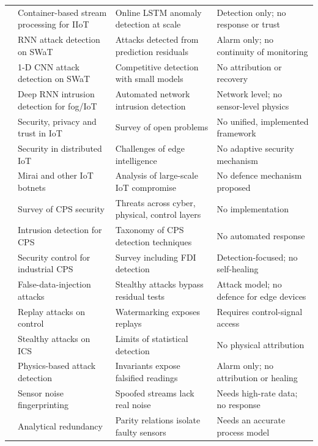 {\begin{longtable}{@{}P{0.9cm} P{4.4cm} P{4.0cm} P{4.0cm}@{}}
\cite{wang2023container} & Container-based stream processing for IIoT & Online LSTM anomaly detection at scale & Detection only; no response or trust \\
\cite{goh2017rnn} & RNN attack detection on SWaT & Attacks detected from prediction residuals & Alarm only; no continuity of monitoring \\
\cite{kravchik2018cnn} & 1-D CNN attack detection on SWaT & Competitive detection with small models & No attribution or recovery \\
\cite{almiani2020rnn} & Deep RNN intrusion detection for fog/IoT & Automated network intrusion detection & Network level; no sensor-level physics \\
\cite{sicari2015road} & Security, privacy and trust in IoT & Survey of open problems & No unified, implemented framework \\
\cite{roman2013features} & Security in distributed IoT & Challenges of edge intelligence & No adaptive security mechanism \\
\cite{kolias2017mirai} & Mirai and other IoT botnets & Analysis of large-scale IoT compromise & No defence mechanism proposed \\
\cite{humayed2017cps} & Survey of CPS security & Threats across cyber, physical, control layers & No implementation \\
\cite{mitchell2014ids} & Intrusion detection for CPS & Taxonomy of CPS detection techniques & No automated response \\
\cite{ding2018survey} & Security control for industrial CPS & Survey including FDI detection & Detection-focused; no self-healing \\
\cite{liu2009fdi} & False-data-injection attacks & Stealthy attacks bypass residual tests & Attack model; no defence for edge devices \\
\cite{mo2009replay} & Replay attacks on control & Watermarking exposes replays & Requires control-signal access \\
\cite{urbina2016stealthy} & Stealthy attacks on ICS & Limits of statistical detection & No physical attribution \\
\cite{giraldo2018physics} & Physics-based attack detection & Invariants expose falsified readings & Alarm only; no attribution or healing \\
\cite{ahmed2018noise} & Sensor noise fingerprinting & Spoofed streams lack real noise & Needs high-rate data; no response \\
\cite{chow1984redundancy} & Analytical redundancy & Parity relations isolate faulty sensors & Needs an accurate process model \\

\end{longtable}}
